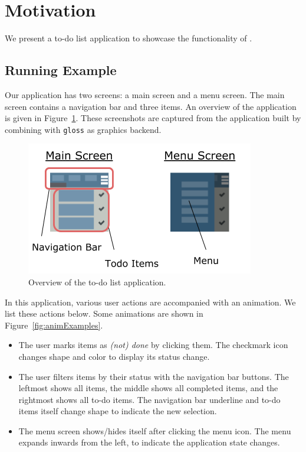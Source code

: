 \section{Motivation}
\label{sec:motivation}

We present a to-do list application to showcase the
functionality of \dsl{}.

\subsection{Running Example}

Our application has two screens: a main screen and a menu screen. The main screen contains a navigation bar and three items. An overview of the application is given in Figure~\ref{fig:appOverview}. These screenshots are captured from the application built by combining \dsl{} with \texttt{gloss} as graphics backend.

\begin{figure}[!htbp]
\centering
\includegraphics[width=\figscale\textwidth]{pictures/app_overview}
\caption{Overview of the to-do list application.}
\label{fig:appOverview}
\end{figure}

In this application, various user actions are accompanied with an animation.
We list these actions below. Some animations are shown in Figure~\ref{fig:animExamples}.
\begin{itemize}
\item The user marks items as \emph{(not) done} by clicking them. The
checkmark icon changes shape and color to display its status change.
\item The user filters items by their status with the navigation bar
buttons. The leftmost shows all items, the middle shows all completed items, and
the rightmost shows all to-do items. The navigation bar underline and to-do
items itself change shape to indicate the new selection.
\item The menu screen shows/hides itself after clicking the menu icon. The
menu expands inwards from the left, to indicate the application state changes.
\end{itemize}


